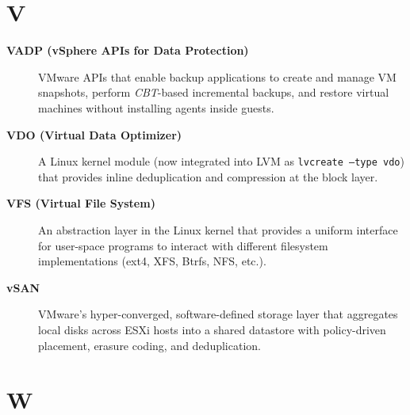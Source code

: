 \section*{V}

\begin{description}

\item[\textbf{VADP (vSphere APIs for Data Protection)}]
VMware APIs that enable backup applications to create and manage VM
snapshots, perform \textit{CBT}-based incremental backups, and restore
virtual machines without installing agents inside guests.

\item[\textbf{VDO (Virtual Data Optimizer)}]
A Linux kernel module (now integrated into LVM as \texttt{lvcreate --type
vdo}) that provides inline deduplication and compression at the block
layer.

\item[\textbf{VFS (Virtual File System)}]
An abstraction layer in the Linux kernel that provides a uniform interface
for user-space programs to interact with different filesystem
implementations (ext4, XFS, Btrfs, NFS, etc.).

\item[\textbf{vSAN}]
VMware's hyper-converged, software-defined storage layer that aggregates
local disks across ESXi hosts into a shared datastore with policy-driven
placement, erasure coding, and deduplication.

\end{description}

\section*{W}

